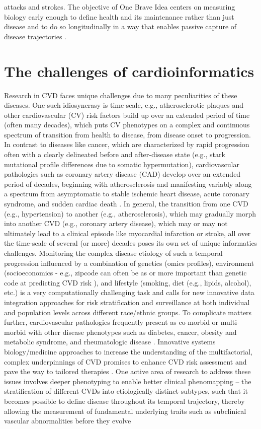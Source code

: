 \documentclass[letter]{bib}
\begin{document}
attacks and strokes.  The objective of One Brave Idea centers on measuring biology early enough to define health and its maintenance rather than just disease and to do so longitudinally in a way that enables passive capture of disease trajectories \citep{Cranley:2018:New}.    
	
	\section*{The challenges of cardioinformatics}
Research in CVD faces unique challenges due to many peculiarities of these diseases.
	One such idiosyncrasy is time-scale, e.g., atherosclerotic plaques and other cardiovascular (CV) risk factors build up over an extended period of time (often many decades), which puts CV phenotypes on a complex and continuous spectrum of transition from health to disease, from disease onset to progression.  In contrast to diseases like cancer, which are characterized by rapid progression often with a clearly delineated before and after-disease state (e.g., stark mutational profile differences due to somatic hypermutation), cardiovascular pathologies such as coronary artery disease (CAD) develop over an extended period of decades, beginning with atherosclerosis and manifesting variably along a spectrum from asymptomatic to stable ischemic heart disease, acute coronary syndrome, and sudden cardiac death \citep{Johnson:2017:Enabling}.  In general, the transition from one CVD (e.g., hypertension) to another (e.g., atherosclerosis), which may gradually morph into another CVD (e.g., coronary artery disease), which may or may not ultimately lead to a clinical episode like myocardial infarction or stroke, all over the time-scale of several (or more) decades poses its own set of unique informatics challenges.  Monitoring the complex disease etiology of such a temporal progression influenced by a combination of genetics (omics profiles), environment (socioeconomics - e.g., zipcode can often be as or more important than genetic code at predicting CVD risk \citep{AHA:2017:Neighborhoods,Ward:2018:zip}), and lifestyle (smoking, diet (e.g., lipids, alcohol), etc.) is a very computationally challenging task and calls for new innovative data integration approaches for risk stratification and surveillance at both individual and population levels across different race/ethnic groups.  To complicate matters further, cardiovascular pathologies frequently present as co-morbid or multi-morbid with other disease phenotypes such as diabetes, cancer, obesity and metabolic syndrome, and rheumatologic disease \citep{Johnson:2017:Enabling}.  Innovative systems biology/medicine approaches to increase the understanding of the multifactorial, complex underpinnings of CVD promises to enhance CVD risk assessment and pave the way to tailored therapies \cite{Kramer:2018:New}.  One active area of research to address these issues involves deeper phenotyping to enable better clinical phenomapping -- the stratification of different CVDs into etiologically distinct subtypes, such that it becomes possible to define disease throughout its temporal trajectory, thereby allowing the measurement of fundamental underlying traits such as subclinical vascular abnormalities before they evolve 
\end{document}
